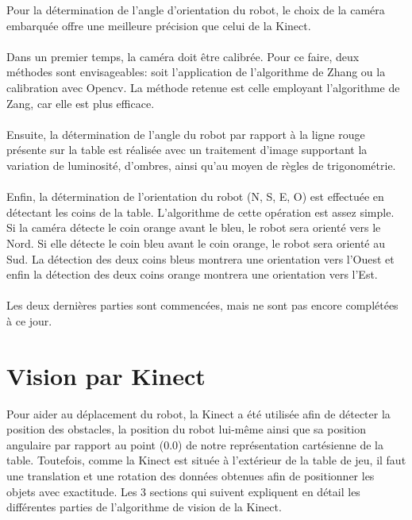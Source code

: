 Pour la détermination de l'angle d’orientation du robot, le choix de la caméra embarquée offre une meilleure précision que celui de la Kinect. 

\paragraph{}Dans un premier temps, la caméra doit être calibrée. Pour ce faire, deux méthodes sont envisageables: soit l’application de l’algorithme de Zhang ou la calibration avec Opencv. La méthode retenue est celle employant l'algorithme de Zang, car elle est plus efficace. 

\paragraph{}Ensuite, la détermination de l’angle du robot par rapport à la ligne rouge présente sur la table est réalisée avec un traitement d’image supportant la variation de luminosité, d’ombres, ainsi qu'au moyen de règles de trigonométrie.

\paragraph{}Enfin,  la détermination de l’orientation du robot (N, S, E, O) est effectuée en détectant les coins de la table. 
L’algorithme de cette opération est assez simple. Si la caméra détecte le coin orange avant le bleu, le robot sera orienté vers le Nord. Si elle détecte le coin bleu avant le coin orange, le robot sera orienté au Sud. La détection des deux coins bleus montrera une orientation vers l’Ouest et enfin la détection des deux coins orange montrera une orientation vers l’Est.

\paragraph{}Les deux dernières parties sont commencées, mais ne sont pas encore complétées à ce jour.


\section{Vision par Kinect}
Pour aider au déplacement du robot, la Kinect a été utilisée afin de détecter la position des obstacles, la position du robot lui-même ainsi que sa position angulaire par rapport au point (0.0) de notre représentation cartésienne de la table. Toutefois, comme la Kinect est située à l'extérieur de la table de jeu, il faut une translation et une rotation des données obtenues afin de positionner les objets avec exactitude. Les 3 sections qui suivent expliquent en détail les différentes parties de l'algorithme de vision de la Kinect.

